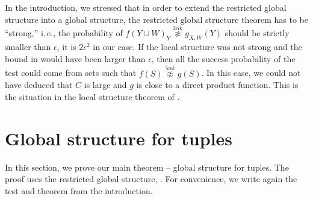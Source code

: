 \documentclass[11pt]{article}
\numberwithin{equation}{section}
\theoremstyle{definition}
\theoremstyle{plain}
\newcommand{\ie}{i.\,e.}
\newcommand\f{f} %
\newcommand\setf{f} %
\newcommand{\g}{g} %
\newcommand\pf{g} %
\newcommand\neqg[1]{\stackrel{{#1}}{ \not\approx}} %
\begin{document}
In the introduction, we stressed that in order to extend the restricted global structure into a global structure, the restricted global structure theorem has to be ``strong,'' \ie, the probability of $\f(Y\cup W)_Y \neqg{3\alpha k} \g_{X,W}(Y)$ should be strictly smaller than $\epsilon$, it is $2\epsilon^2$ in our case. If the local structure was not strong and the bound in  would have been larger than $\epsilon$, then all the success probability of the test could come from sets such that $\setf(S)\neqg{5\alpha k}\g(S)$. In this case, we could not have deduced that $C$ is large and $\pf$ is close to a direct product function. This is the situation in the local structure theorem of \cite{dinur2014direct}.

\section{Global structure for tuples}\label{sec:global}
In this section, we prove our main theorem -- global structure for tuples. The proof uses the restricted global structure, .  For convenience, we write again the test and theorem from the introduction.
\end{document}
